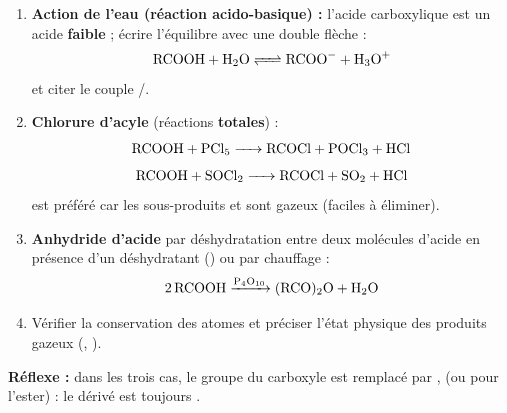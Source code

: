 \documentclass[11pt]{article}
\begin{document}
\begin{methode}
\begin{enumerate}
\item \textbf{Action de l'eau (réaction acido-basique) :} l'acide carboxylique est un acide \textbf{faible} ; écrire l'équilibre avec une double flèche :
\[ \ce{RCOOH + H2O <=> RCOO- + H3O+} \]
et citer le couple /.
\item \textbf{Chlorure d'acyle} (réactions \textbf{totales}) :
\[ \ce{RCOOH + PCl5 -> RCOCl + POCl3 + HCl} \]
\[ \ce{RCOOH + SOCl2 -> RCOCl + SO2 + HCl} \]
 est préféré car les sous-produits  et  sont gazeux (faciles à éliminer).
\item \textbf{Anhydride d'acide} par déshydratation entre deux molécules d'acide en présence d'un déshydratant () ou par chauffage :
\[ \ce{2 RCOOH ->[P4O10] (RCO)2O + H2O} \]
\item Vérifier la conservation des atomes et préciser l'état physique des produits gazeux (, ).
\end{enumerate}
\textbf{Réflexe :} dans les trois cas, le groupe  du carboxyle est remplacé par ,  (ou  pour l'ester) : le dérivé est toujours .
\end{methode}
\end{document}

